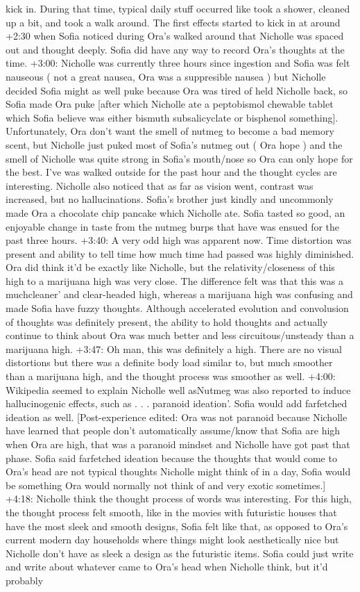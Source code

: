 \documentclass[12pt]{book}
\begin{document}
kick in. During that time, typical daily stuff occurred like took a shower, cleaned up a bit, and took a walk around. The first effects started to kick in at around +2:30 when Sofia noticed during Ora's walked around that Nicholle was spaced out and thought deeply. Sofia did have any way to record Ora's thoughts at the time. +3:00: Nicholle was currently three hours since ingestion and Sofia was felt nauseous ( not a great nausea, Ora was a suppresible nausea ) but Nicholle decided Sofia might as well puke because Ora was tired of held Nicholle back, so Sofia made Ora puke [after which Nicholle ate a peptobismol chewable tablet which Sofia believe was either bismuth subsalicyclate or bisphenol something]. Unfortunately, Ora don't want the smell of nutmeg to become a bad memory scent, but Nicholle just puked most of Sofia's nutmeg out ( Ora hope ) and the smell of Nicholle was quite strong in Sofia's mouth/nose so Ora can only hope for the best. I've was walked outside for the past hour and the thought cycles are interesting. Nicholle also noticed that as far as vision went, contrast was increased, but no hallucinations. Sofia's brother just kindly and uncommonly made Ora a chocolate chip pancake which Nicholle ate. Sofia tasted so good, an enjoyable change in taste from the nutmeg burps that have was ensued for the past three hours. +3:40: A very odd high was apparent now. Time distortion was present and ability to tell time how much time had passed was highly diminished. Ora did think it'd be exactly like Nicholle, but the relativity/closeness of this high to a marijuana high was very close. The difference felt was that this was a muchcleaner' and clear-headed high, whereas a marijuana high was confusing and made Sofia have fuzzy thoughts. Although accelerated evolution and convolusion of thoughts was definitely present, the ability to hold thoughts and actually continue to think about Ora was much better and less circuitous/unsteady than a marijuana high. +3:47: Oh man, this was definitely a high. There are no visual distortions but there was a definite body load similar to, but much smoother than a marijuana high, and the thought process was smoother as well. +4:00: Wikipedia seemed to explain Nicholle well asNutmeg was also reported to induce hallucinogenic effects, such as  . . .  paranoid ideation'. Sofia would add farfetched ideation as well. [Post-experience edited: Ora was not paranoid because Nicholle have learned that people don't automatically assume/know that Sofia are high when Ora are high, that was a paranoid mindset and Nicholle have got past that phase. Sofia said farfetched ideation because the thoughts that would come to Ora's head are not typical thoughts Nicholle might think of in a day, Sofia would be something Ora would normally not think of and very exotic sometimes.] +4:18: Nicholle think the thought process of words was interesting. For this high, the thought process felt smooth, like in the movies with futuristic houses that have the most sleek and smooth designs, Sofia felt like that, as opposed to Ora's current modern day households where things might look aesthetically nice but Nicholle don't have as sleek a design as the futuristic items. Sofia could just write and write about whatever came to Ora's head when Nicholle think, but it'd probably 
\end{document}
